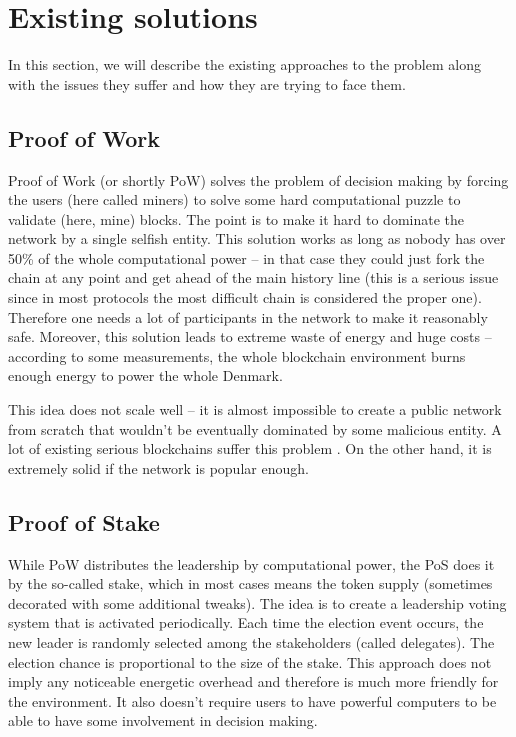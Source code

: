 \section{Existing solutions}

In this section, we will describe the existing approaches to the problem along
with the issues they suffer and how they are trying to face them.

\subsection{Proof of Work}

Proof of Work (or shortly PoW) solves the problem of decision making by forcing the
users (here called miners) to solve some hard computational puzzle to validate
(here, mine) blocks\cite{bitcoin}.
The point is to make it hard to dominate the network by a
single selfish entity. This solution works as long as nobody has over 50\% of the whole
computational power – in that case they could just fork the chain at any point
and get ahead of the main history line (this is a serious issue since in most
protocols the most difficult chain is considered the proper one). Therefore one needs a
lot of participants in the network to make it reasonably safe. Moreover, this
solution leads to extreme waste of energy and huge costs – according to some
measurements, the whole blockchain environment burns enough energy to power
the whole Denmark\cite{bitcoin_energy}.

This idea does not scale well – it is almost impossible to create a public
network from scratch that wouldn't be eventually dominated by some malicious
entity. A lot of existing serious blockchains suffer this problem
\cite{51attack}. On the other hand, it is extremely solid if
the network is popular enough.

\subsection{Proof of Stake}

While PoW distributes the leadership by computational power, the PoS does it by
the so-called stake, which in most cases means the token supply (sometimes decorated
with some additional tweaks)\cite{peercoin}\cite{cryptocurr_without_pow}.
The idea is to create a leadership voting system
that is activated periodically. Each time the election event occurs,
the new leader is randomly selected among the stakeholders (called delegates).
The election chance is proportional to the size of the stake. This approach does
not imply any noticeable energetic overhead and therefore is much more friendly for the
environment. It also doesn't require users to have powerful computers to be able to
have some involvement in decision making.

